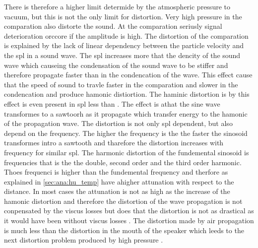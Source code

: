 There is therefore a higher limit determide by the atmospheric pressure to vacuum, but this is not the only limit for distortion. Very high pressure in the comparation also distorte the sound. At the comparation seriusly signal deterioration orccore if the amplitude is high. The distortion of the comparation is explained by the lack of linear dependency between the particle velocity and the \gls{spl} in a sound wave. The \gls{spl} increases more that the dencity of the sound wave which causeing the condensation of the sound wave to be stiffer and therefore propagate faster than in the condencation of the wave. This effect cause that the speed of sound to travle faster in the comparation and slower in the condencation and produce hamonic distiortion. The haminic distortion is by this effect is even present in \gls{spl} less than  \citep{czerwinski1999air}.
The effect is athat the sine wave transformes to a sawtoorh as it propagate which transfer energy to the hamonic of the propagation wave. The distortion is not only \gls{spl} dependent, but also depend on the frequency. The higher the frequency is the the faster the sinosoid transformes intro a sawtooth and tharefore the distortion increases with frequency for similar \gls{spl}. The harmonic distortion of the fundemental sinosoid is frequencies that is the the double, second order and the third order harmonic. Thoes frequenci is higher than the fundemental frequency and therfore as explained in \autoref{sec:ana:hu_temp} have  ahigher attunation with respect to the distance. In most cases the attunation is not as high as the increase of the hamonic distortion and therefore the distortion of the wave propagation is not conpensated by the viscus losses but does that the distortion is not as drastical as it would have been without viscus losses \citep{czerwinski1999air}. The distortion made by air propagation is much less than the distortion in the mouth of the speaker which leeds to the next distortion problem produced by high pressure \citep{czerwinski1999air}.

